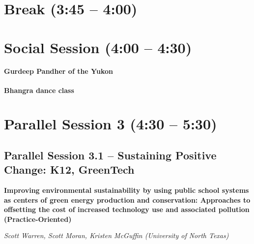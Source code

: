 \documentclass[
]{book}
\begin{document}
\hypertarget{break-345-400}{%
\section*{Break (3:45 -- 4:00)}\label{break-345-400}}

\hypertarget{social-session-400-430}{%
\section*{Social Session (4:00 -- 4:30)}\label{social-session-400-430}}

\begin{gh}
\hypertarget{gurdeep-pandher-of-the-yukon}{%
\paragraph*{Gurdeep Pandher of the
Yukon}\label{gurdeep-pandher-of-the-yukon}}

\textbf{Bhangra dance class}
\end{gh}

\hypertarget{parallel-session-3-430-530}{%
\section*{Parallel Session 3 (4:30 -- 5:30)}\label{parallel-session-3-430-530}}

\hypertarget{parallel-session-3.1-sustaining-positive-change-k12-greentech}{%
\subsection*{Parallel Session 3.1 -- Sustaining Positive Change: K12, GreenTech}\label{parallel-session-3.1-sustaining-positive-change-k12-greentech}}

\begin{secondary}
\textbf{Improving environmental sustainability by using public school
systems as centers of green energy production and conservation:
Approaches to offsetting the cost of increased technology use and
associated pollution (Practice-Oriented)}

\emph{Scott Warren, Scott Moran, Kristen McGuffin (University of North
Texas)}
\end{secondary}
\end{document}
